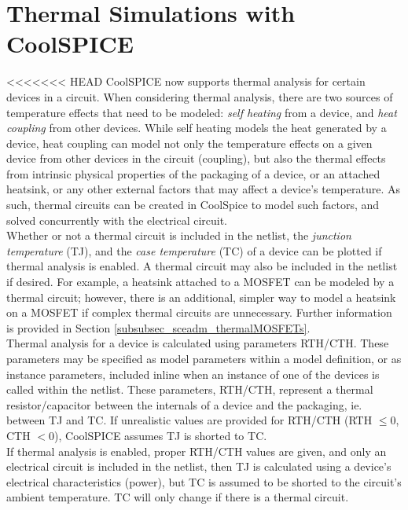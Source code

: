 \chapter{Thermal Simulations with CoolSPICE}
\label{chap_thermalsimulations_tas}

<<<<<<< HEAD
CoolSPICE now supports thermal analysis for certain devices in a circuit. When considering thermal analysis, there are two sources of temperature effects that need to be modeled: \textit{self heating} from a device, and \textit{heat coupling} from other devices. While self heating models the heat generated by a device, heat coupling can model not only the temperature effects on a given device from other devices in the circuit (coupling), but also the thermal effects from intrinsic physical properties of the packaging of a device, or an attached heatsink, or any other external factors that may affect a device's temperature. As such, thermal circuits can be created in CoolSpice to model such factors, and solved concurrently with the electrical circuit. \\

Whether or not a thermal circuit is included in the netlist, the \textit{junction temperature} (TJ), and the \textit{case temperature} (TC) of a device can be plotted if thermal analysis is enabled. A thermal circuit may also be included in the netlist if desired. For example, a heatsink attached to a MOSFET can be modeled by a thermal circuit; however, there is an additional, simpler way to model a heatsink on a MOSFET if complex thermal circuits are unnecessary. Further information is provided in Section \ref{subsubsec_sceadm_thermalMOSFETs}. \\

Thermal analysis for a device is calculated using parameters RTH/CTH. These parameters may be specified as model parameters within a model definition, or as instance parameters, included inline when an instance of one of the devices is called within the netlist. These parameters, RTH/CTH, represent a thermal resistor/capacitor between the internals of a device and the packaging, ie. between TJ and TC. If unrealistic values are provided for RTH/CTH (RTH $\leq 0$, CTH $< 0$), CoolSPICE assumes TJ is shorted to TC. \\

If thermal analysis is enabled, proper RTH/CTH values are given, and only an electrical circuit is included in the netlist, then TJ is calculated using a device's electrical characteristics (power), but TC is assumed to be shorted to the circuit's ambient temperature. TC will only change if there is a thermal circuit.

